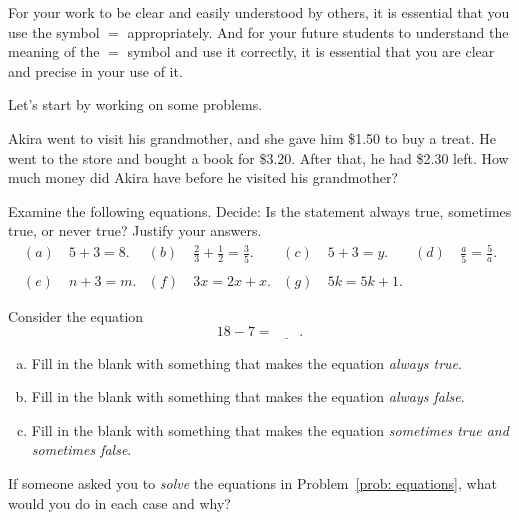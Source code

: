 For your work to be clear and easily understood by others, it is essential that you use the symbol $=$ appropriately.  And for your future students to understand the meaning of the $=$ symbol and use it correctly, it is essential that you  are clear and precise in your use of it.

Let's start by working on some problems.

\begin{problem}\label{prob: grandma}
Akira went to visit his grandmother, and she gave him \$1.50 to buy a treat.
He went to the store and bought a book for \$3.20.   After that, he had \$2.30 left.
How much money did Akira have before he visited his grandmother?
\end{problem}

\bigskip

\begin{problem}\label{prob: equations}
Examine the following equations.  Decide: Is the statement always true, sometimes true, or never true?  Justify your answers.
\begin{align*}
(a) &\ 5 + 3 = 8.
&
(b) &\ \frac 23 + \frac 12 = \frac 35.
&
(c) & \ 5 + 3 = y.
& (d)& \ 
\frac a 5 = \frac 5 a.
\\
\\
(e) & \ n + 3 = m.
&
(f) & \ 3x = 2x + x.
&
(g)& \ 
5k = 5k + 1.
\end{align*}


\end{problem}

\bigskip


\begin{problem}\label{prob: equations2}
Consider the equation
\[ 
18 - 7 = \underline{\phantom{blah}}.
\]

\begin{enumerate}[(a)]
\item
Fill in the blank with something that makes the equation \emph{always true}.\\
\item
Fill in the blank with something that makes the equation \emph{always false}.\\
\item
Fill in the blank with something that makes the equation \emph{sometimes true and sometimes false}.
\end{enumerate}
\end{problem}



\bigskip


\begin{problem}
If someone asked you to \emph{solve} the equations in Problem~\ref{prob: equations}, what would you do in each case and why?
\end{problem}



